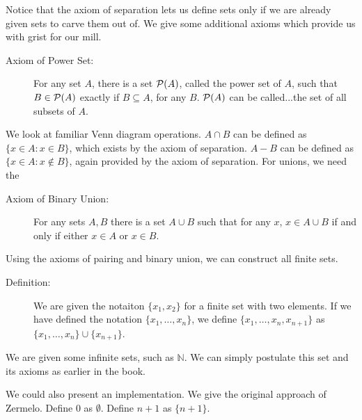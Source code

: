 \documentclass[12pt]{article}
\begin{document}
Notice that the axiom of separation lets us define sets only if we are already given sets to carve them out of.  We give some additional axioms which provide us with grist for our mill.

\begin{description}

\item[Axiom of Power Set:]  For any set $A$, there is a set ${\cal P}(A)$, called the power set of $A$, such that $B \in {\cal P}(A)$ exactly if $B \subseteq A$, for any $B$.  ${\cal P}(A)$ can be called...the set of all subsets of $A$.

\end{description}

We look at familiar Venn diagram operations.  $A \cap B$ can be defined as $\{x \in A:x \in B\}$, which exists by the axiom of separation.  $A - B$ can be defined as $\{x \in A: x \not\in B\}$, again provided by the axiom of separation.  For unions, we need the

\begin{description}

\item[Axiom of Binary Union:]  For any sets $A,B$ there is a set $A \cup B$ such that for any $x$, $x \in A \cup B$ if and only if either $x \in A$ or $x \in B$.

\end{description}

Using the axioms of pairing and binary union, we can construct all finite sets.

\begin{description}

\item[Definition:]  We are given the notaiton $\{x_1,x_2\}$ for a finite set with two elements.  If we have defined
the notation $\{x_1,\ldots,x_n\}$, we define $\{x_1,\ldots,x_n,x_{n+1}\}$  as $\{x_1,\ldots,x_n\} \cup \{x_{n+1}\}$.

\end{description}

We are given some infinite sets, such as $\mathbb N$.  We can simply postulate this set and its axioms as earlier in the book.

We could also present an implementation.  We give the original approach of Zermelo.  Define 0 as $\emptyset$.
Define $n+1$ as $\{n+1\}$.
\end{document}
